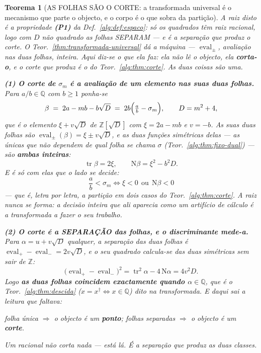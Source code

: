 \documentclass[11pt,a4paper]{article}
\newtheorem{teorema}{Teorema}
\newcommand{\dg}{^{\dagger}}
\begin{document}
\begin{teorema}[AS FOLHAS SÃO O CORTE: a transformada universal é o mecanismo que parte
o objecto, e o corpo é o que sobra da partição]\label{thm:folhas-corte}
\emph{A raiz disto é a propriedade} \textbf{(P1)} \emph{da Def.~\ref{alg:def:espaco}}: só os
quadrados têm raiz racional, logo com $D$ não quadrado as folhas SEPARAM --- e é a
separação que produz o corte.
O Teor.~\ref{thm:transformada-universal} dá a máquina --- $\operatorname{eval}_\pm$, avaliação
nas duas folhas, inteira. Aqui diz-se o que ela \emph{faz}: ela não lê o objecto, ela
\textbf{corta-o}, e o corte que produz é o do Teor.~\ref{alg:thm:corte}. As duas coisas são
uma.

\textbf{(1) O corte de $\sigma_m$ é a avaliação de um elemento nas suas duas folhas.}
Para $a/b\in\mathbb{Q}$ com $b\geq1$ ponha-se
\[
\beta \;=\; 2a-mb-b\sqrt D \;=\; 2b\Bigl(\tfrac ab-\sigma_m\Bigr),
\qquad D=m^{2}+4 ,
\]
que é o elemento $\xi+v\sqrt D$ de $\mathbb{Z}[\sqrt D]$ com $\xi=2a-mb$ e $v=-b$. As suas
duas folhas são $\operatorname{eval}_\pm(\beta)=\xi\pm v\sqrt D$, e as duas funções
simétricas delas --- as \emph{únicas} que não dependem de qual folha se chama $\sigma$
(Teor.~\ref{alg:thm:fixo-dual}) --- são \textbf{ambas inteiras}:
\[
\operatorname{tr}\beta=2\xi ,\qquad \mathrm{N}\beta=\xi^{2}-b^{2}D .
\]
E é só com elas que o lado se decide:
\[
\boxed{\;\frac ab<\sigma_m \iff \xi<0 \ \ \text{ou}\ \ \mathrm{N}\beta<0\;}
\]
--- que é, letra por letra, a partição em dois casos do Teor.~\ref{alg:thm:corte}. \emph{A raiz
nunca se forma}: a decisão inteira que ali aparecia como um artifício de cálculo é a
transformada a fazer o seu trabalho.

\textbf{(2) O corte é a SEPARAÇÃO das folhas, e o discriminante mede-a.} Para
$\alpha=u+v\sqrt D$ qualquer, a separação das duas folhas é
$\operatorname{eval}_+-\operatorname{eval}_-=2v\sqrt D$, e o seu quadrado calcula-se das
duas simétricas sem sair de $\mathbb{Z}$:
\[
\bigl(\operatorname{eval}_+-\operatorname{eval}_-\bigr)^{2}
=\operatorname{tr}^{2}\alpha-4\,\mathrm{N}\alpha=4v^{2}D .
\]
Logo \textbf{as duas folhas coincidem exactamente quando $\alpha\in\mathbb{Q}$}, que é o
Teor.~\ref{alg:thm:descida} ($x=x\dg\iff x\in\mathbb{Q}$) dito na transformada. E daqui sai a
leitura que faltava:
\begin{center}
\emph{folha única $\Rightarrow$ o objecto é um \textbf{ponto}; folhas separadas
$\Rightarrow$ o objecto é um \textbf{corte}.}
\end{center}
Um racional não corta nada --- está lá. É a separação que produz as duas classes.


\end{teorema}
\end{document}
